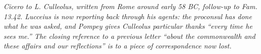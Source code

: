 
\textit{Cicero to L. Culleolus, written from Rome around early
58 BC, follow-up to \textit{Fam.} 13.42. Lucceius is now
reporting back through his agents: the proconsul has done what
he was asked, and Pompey gives Culleolus particular thanks
``every time he sees me.'' The closing reference to a previous
letter ``about the commonwealth and these affairs and our
reflections'' is to a piece of correspondence now lost.}
